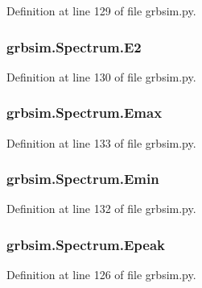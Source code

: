 Definition at line 129 of file grbsim.\-py.

\hypertarget{classgrbsim_1_1_spectrum_abfe196b528e8b0e5b9cc97df1b82e9a5}{
\subsubsection[{E2}]{\setlength{\rightskip}{0pt plus 5cm}grbsim.\-Spectrum.\-E2}}\label{classgrbsim_1_1_spectrum_abfe196b528e8b0e5b9cc97df1b82e9a5}


Definition at line 130 of file grbsim.\-py.

\hypertarget{classgrbsim_1_1_spectrum_a4c52b101a6634e432f765208fefbd9a4}{
\subsubsection[{Emax}]{\setlength{\rightskip}{0pt plus 5cm}grbsim.\-Spectrum.\-Emax}}\label{classgrbsim_1_1_spectrum_a4c52b101a6634e432f765208fefbd9a4}


Definition at line 133 of file grbsim.\-py.

\hypertarget{classgrbsim_1_1_spectrum_a8ac0b75b32e04abda6c277b2b397106f}{
\subsubsection[{Emin}]{\setlength{\rightskip}{0pt plus 5cm}grbsim.\-Spectrum.\-Emin}}\label{classgrbsim_1_1_spectrum_a8ac0b75b32e04abda6c277b2b397106f}


Definition at line 132 of file grbsim.\-py.

\hypertarget{classgrbsim_1_1_spectrum_aac7eb09edb7bccef0e1121c3eb4f71c4}{
\subsubsection[{Epeak}]{\setlength{\rightskip}{0pt plus 5cm}grbsim.\-Spectrum.\-Epeak}}\label{classgrbsim_1_1_spectrum_aac7eb09edb7bccef0e1121c3eb4f71c4}


Definition at line 126 of file grbsim.\-py.


